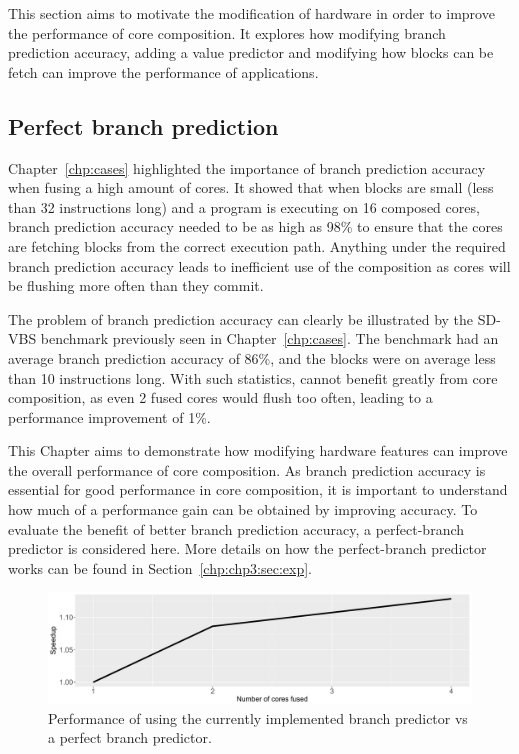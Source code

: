 This section aims to motivate the modification of hardware in order to improve the performance of core composition.
It explores how modifying branch prediction accuracy, adding a value predictor and modifying how blocks can be fetch can improve the performance of applications.

\subsection{Perfect branch prediction}

Chapter~\ref{chp:cases} highlighted the importance of branch prediction accuracy when fusing a high amount of cores.
It showed that when blocks are small (less than 32 instructions long) and a program is executing on 16 composed cores, branch prediction accuracy needed to be as high as 98\% to ensure that the cores are fetching blocks from the correct execution path.
Anything under the required branch prediction accuracy leads to inefficient use of the composition as cores will be flushing more often than they commit.

The problem of branch prediction accuracy can clearly be illustrated by the SD-VBS benchmark  previously seen in Chapter~\ref{chp:cases}.
The benchmark had an average branch prediction accuracy of 86\%, and the blocks were on average less than 10 instructions long.
With such statistics,  cannot benefit greatly from core composition, as even 2 fused cores would flush too often, leading to a performance improvement of 1\%.

This Chapter aims to demonstrate how modifying hardware features can improve the overall performance of core composition.
As branch prediction accuracy is essential for good performance in core composition, it is important to understand how much of a performance gain can be obtained by improving accuracy.
To evaluate the benefit of better branch prediction accuracy, a perfect-branch predictor is considered here.
More details on how the perfect-branch predictor works can be found in Section~\ref{chp:chp3:sec:exp}.

\begin{figure}[t]
    \centering
    \includegraphics[width=1\textwidth]{chapter3/graphics/mser_branch_motiv.pdf}
    \caption{Performance of  using the currently implemented branch predictor vs a perfect branch predictor.}
    \label{fig:mser_motiv}
	\vspace{1em}
\end{figure}

